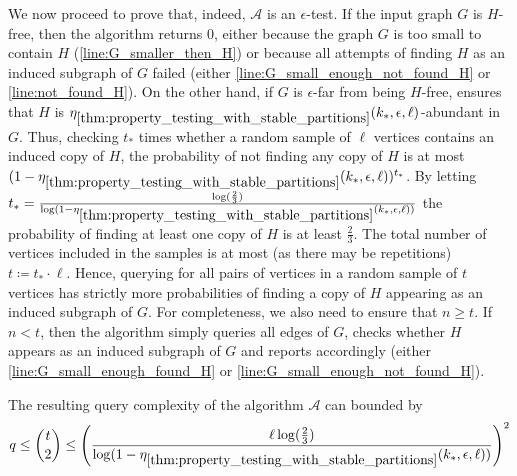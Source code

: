         We now proceed to prove that, indeed, $\mathcal{A}$ is an $\epsilon$-test.
        If the input graph $G$ is $H$-free, then the algorithm returns $0$, either because the graph $G$ is too small to
        contain $H$ (\cref{line:G_smaller_then_H}) or because all attempts of finding $H$ as an induced subgraph of $G$
        failed (either \cref{line:G_small_enough_not_found_H} or \cref{line:not_found_H}).
        On the other hand, if $G$ is $\epsilon$-far from being $H$-free, 
        ensures that $H$ is $\eta_{\ref{thm:property_testing_with_stable_partitions}}(k_*, \epsilon, \ell)$-abundant in $G$.
        Thus, checking $t_*$ times whether a random sample of $\ell$ vertices contains an
        induced copy of $H$, the probability of not finding any copy of $H$ is at most
        $( 1 - \eta_{\ref{thm:property_testing_with_stable_partitions}}(k_*, \epsilon, \ell) )^{t_*}$.
        By letting $t_* = \frac{\log( \frac{2}{3} )}
            {\log( 1 - \eta_{\ref{thm:property_testing_with_stable_partitions}}(k_*, \epsilon, \ell) )}$
        the probability of finding at least one copy of $H$ is at least $\frac{2}{3}$.
        The total number of vertices included in the samples is at most (as there may be repetitions) $t \coloneqq t_* \cdot \ell$.
        Hence, querying for all pairs of vertices in a random sample of $t$ vertices has strictly more probabilities of
        finding a copy of $H$ appearing as an induced subgraph of $G$.
        For completeness, we also need to ensure that $n \geq t$.
        If $n < t$, then the algorithm simply queries all edges of $G$, checks whether $H$ appears as an induced subgraph
        of $G$ and reports accordingly (either \cref{line:G_small_enough_found_H} or \cref{line:G_small_enough_not_found_H}).

        The resulting query complexity of the algorithm $\mathcal{A}$ can bounded by
        \[
            q \leq {t \choose 2}
              \leq \left(  \frac{\ell \log( \frac{2}{3} )}
                   {\log( 1 - \eta_{\ref{thm:property_testing_with_stable_partitions}}(k_*, \epsilon, \ell) )} \right)^2
        \]


